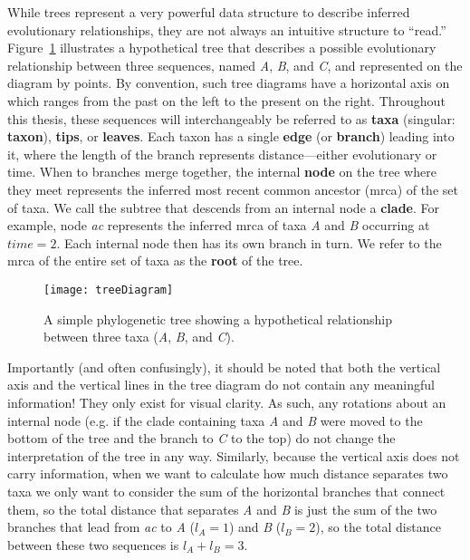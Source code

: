 While trees represent a very powerful data structure to describe inferred evolutionary relationships, they are not always an intuitive structure to ``read.''
Figure~\ref{fig:treeDiagram} illustrates a hypothetical tree that describes a possible evolutionary relationship between three sequences, named \textit{A}, \textit{B}, and \textit{C}, and represented on the diagram by points.
By convention, such tree diagrams have a horizontal axis on which ranges from the past on the left to the present on the right.
Throughout this thesis, these sequences will interchangeably be referred to as \textbf{taxa} (singular: \textbf{taxon}), \textbf{tips}, or \textbf{leaves}.
Each taxon has a single \textbf{edge} (or \textbf{branch}) leading into it, where the length of the branch represents distance---either evolutionary or time.
When to branches merge together, the internal \textbf{node} on the tree where they meet represents the inferred most recent common ancestor (\gls{mrca}) of the set of taxa.
We call the subtree that descends from an internal node a \textbf{clade}.
For example, node \textit{ac} represents the inferred \gls{mrca} of taxa \textit{A} and \textit{B} occurring at $time=2$.
Each internal node then has its own branch in turn.
We refer to the \gls{mrca} of the entire set of taxa as the \textbf{root} of the tree. 

\begin{figure}[ht]
  \centering
  \texttt{[image: treeDiagram]}
  \caption[Example phylogenetic tree]{A simple phylogenetic tree showing a hypothetical relationship between three taxa (\textit{A}, \textit{B}, and \textit{C}).
  }
  \label{fig:treeDiagram}
\end{figure}

Importantly (and often confusingly), it should be noted that both the vertical axis and the vertical lines in the tree diagram do not contain any meaningful information!
They only exist for visual clarity.
As such, any rotations about an internal node (e.g. if the clade containing taxa \textit{A} and \textit{B} were moved to the bottom of the tree and the branch to \textit{C} to the top) do not change the interpretation of the tree in any way.
Similarly, because the vertical axis does not carry information, when we want to calculate how much distance separates two taxa we only want to consider the sum of the horizontal branches that connect them, so the total distance that separates \textit{A} and \textit{B} is just the sum of the two branches that lead from \textit{ac} to \textit{A} ($l_A=1$) and \textit{B} ($l_B=2$), so the total distance between these two sequences is $l_A + l_B = 3$.

